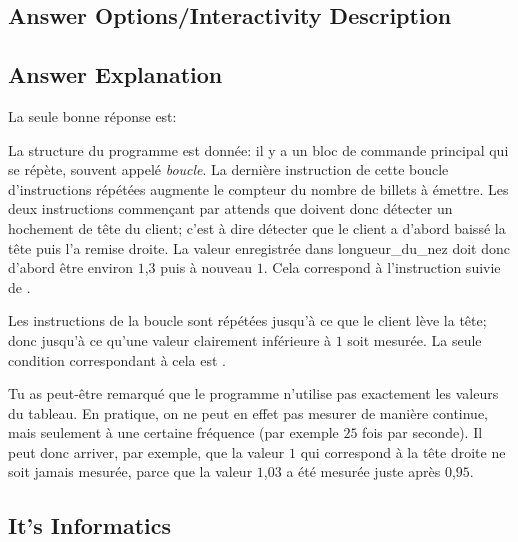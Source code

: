 \documentclass[a4paper,11pt]{report}
\newcommand{\BrochureInlineCode}[1]{{\ttfamily #1}}
\newcommand{\taskGraphicsFolder}{..}
\begin{document}
\begingroup
\renewcommand{\arraystretch}{1.5}
\subsection*{Answer Options/Interactivity Description}



\endgroup

\subsection*{Answer Explanation}

La seule bonne réponse est:

{\centering%
\par}

La structure du programme est donnée: il y a un bloc de commande principal qui se répète, souvent appelé \emph{boucle}. La dernière instruction de cette boucle d’instructions répétées augmente le compteur du nombre de billets à émettre. Les deux instructions commençant par \BrochureInlineCode{attends que} doivent donc détecter un hochement de tête du client; c’est à dire détecter que le client a d’abord baissé la tête puis l’a remise droite. La valeur enregistrée dans longueur\_du\_nez doit donc d’abord être environ $1$,$3$ puis à nouveau $1$. Cela correspond à l’instruction \raisebox{-0.5ex}{} suivie de \raisebox{-0.5ex}{}.

Les instructions de la boucle sont répétées jusqu’à ce que le client lève la tête; donc jusqu’à ce qu’une valeur clairement inférieure à $1$ soit mesurée. La seule condition correspondant à cela est \raisebox{-0.5ex}{}.

Tu as peut-être remarqué que le programme n’utilise pas exactement les valeurs du tableau. En pratique, on ne peut en effet pas mesurer de manière continue, mais seulement à une certaine fréquence (par exemple $25$ fois par seconde). Il peut donc arriver, par exemple, que la valeur $1$ qui correspond à la tête droite ne soit jamais mesurée, parce que la valeur $1$,$03$ a été mesurée juste après $0$,$95$.


\subsection*{It’s Informatics}
\end{document}
